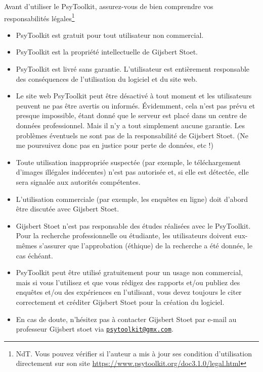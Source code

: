 \documentclass[
]{book}
\providecommand{\tightlist}{%
  \setlength{\itemsep}{0pt}\setlength{\parskip}{0pt}}
\begin{document}
Avant d'utiliser le PsyToolkit, assurez-vous de bien comprendre vos responsabilités légales\footnote{NdT. Vous pouvez vérifier si l'auteur a mis à jour ses condition d'utilisation directement sur son site \url{https://www.psytoolkit.org/doc3.1.0/legal.html}}

\begin{itemize}
\tightlist
\item
  PsyToolkit est gratuit pour tout utilisateur non commercial.
\item
  PsyToolkit est la propriété intellectuelle de Gijsbert Stoet.
\item
  PsyToolkit est livré sans garantie. L'utilisateur est entièrement responsable des conséquences de l'utilisation du logiciel et du site web.
\item
  Le site web PsyToolkit peut être désactivé à tout moment et les utilisateurs peuvent ne pas être avertis ou informés. Évidemment, cela n'est pas prévu et presque impossible, étant donné que le serveur est placé dans un centre de données professionnel. Mais il n'y a tout simplement aucune garantie. Les problèmes éventuels ne sont pas de la responsabilité de Gijsbert Stoet. (Ne me poursuivez donc pas en justice pour perte de données, etc !)
\item
  Toute utilisation inappropriée suspectée (par exemple, le téléchargement d'images illégales indécentes) n'est pas autorisée et, si elle est détectée, elle sera signalée aux autorités compétentes.
\item
  L'utilisation commerciale (par exemple, les enquêtes en ligne) doit d'abord être discutée avec Gijsbert Stoet.
\item
  Gijsbert Stoet n'est pas responsable des études réalisées avec le PsyToolkit. Pour la recherche professionnelle ou étudiante, les utilisateurs doivent eux-mêmes s'assurer que l'approbation (éthique) de la recherche a été donnée, le cas échéant.
\item
  PsyToolkit peut être utilisé gratuitement pour un usage non commercial, mais si vous l'utilisez et que vous rédigez des rapports et/ou publiez des enquêtes et/ou des expériences en l'utilisant, vous devez toujours le citer correctement et créditer Gijsbert Stoet pour la création du logiciel.
\item
  En cas de doute, n'hésitez pas à contacter Gijsbert Stoet par e-mail au professeur Gijsbert stoet via \href{mailto:psytoolkit@gmx.com}{\nolinkurl{psytoolkit@gmx.com}}.
\end{itemize}
\end{document}
